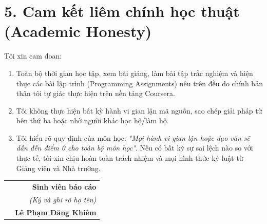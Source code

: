 \documentclass[11pt, a4paper]{article}
\begin{document}
\begin{center}
\end{center}

\vspace{0.5cm}

\section*{\color{primary}5. Cam kết liêm chính học thuật (Academic Honesty)}
\vspace{-0.2cm}
Tôi xin cam đoan:
\begin{enumerate}[label=\arabic*.]
    \item Toàn bộ thời gian học tập, xem bài giảng, làm bài tập trắc nghiệm và hiện thực các bài lập trình (Programming Assignments) nêu trên đều do chính bản thân tôi tự giác thực hiện trên nền tảng Coursera.
    \item Tôi không thực hiện bất kỳ hành vi gian lận mã nguồn, sao chép giải pháp từ bên thứ ba hoặc nhờ người khác học hộ/làm hộ.
    \item Tôi hiểu rõ quy định của môn học: \textit{"Mọi hành vi gian lận hoặc đạo văn sẽ dẫn đến điểm 0 cho toàn bộ môn học"}. Nếu có bất kỳ sự sai lệch nào so với thực tế, tôi xin chịu hoàn toàn trách nhiệm và mọi hình thức kỷ luật từ Giảng viên và Nhà trường.
\end{enumerate}

\vspace{0.8cm}

\noindent
\begin{tabularx}{\textwidth}{@{} X r @{}}
    & \textbf{Sinh viên báo cáo} \\
    & \textit{(Ký và ghi rõ họ tên)} \\[1.8cm]
    & \textbf{Lê Phạm Đăng Khiêm} \\
\end{tabularx}
\end{document}
